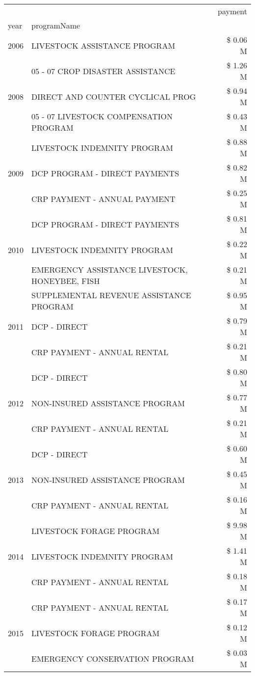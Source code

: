 \begin{tabular}{llr}
\toprule
 &  & payment \\
year & programName &  \\
\midrule
2006 & LIVESTOCK ASSISTANCE PROGRAM & \$ 0.06 M \\
\cline{1-3}
\multirow[t]{3}{*}{2008} & 05 - 07 CROP DISASTER ASSISTANCE & \$ 1.26 M \\
 & DIRECT AND COUNTER CYCLICAL PROG & \$ 0.94 M \\
 & 05 - 07 LIVESTOCK COMPENSATION PROGRAM & \$ 0.43 M \\
\cline{1-3}
\multirow[t]{3}{*}{2009} & LIVESTOCK INDEMNITY PROGRAM & \$ 0.88 M \\
 & DCP PROGRAM - DIRECT PAYMENTS & \$ 0.82 M \\
 & CRP PAYMENT - ANNUAL PAYMENT & \$ 0.25 M \\
\cline{1-3}
\multirow[t]{3}{*}{2010} & DCP PROGRAM - DIRECT PAYMENTS & \$ 0.81 M \\
 & LIVESTOCK INDEMNITY PROGRAM & \$ 0.22 M \\
 & EMERGENCY ASSISTANCE LIVESTOCK, HONEYBEE, FISH & \$ 0.21 M \\
\cline{1-3}
\multirow[t]{3}{*}{2011} & SUPPLEMENTAL REVENUE ASSISTANCE PROGRAM & \$ 0.95 M \\
 & DCP - DIRECT & \$ 0.79 M \\
 & CRP PAYMENT - ANNUAL RENTAL & \$ 0.21 M \\
\cline{1-3}
\multirow[t]{3}{*}{2012} & DCP - DIRECT & \$ 0.80 M \\
 & NON-INSURED ASSISTANCE PROGRAM & \$ 0.77 M \\
 & CRP PAYMENT - ANNUAL RENTAL & \$ 0.21 M \\
\cline{1-3}
\multirow[t]{3}{*}{2013} & DCP - DIRECT & \$ 0.60 M \\
 & NON-INSURED ASSISTANCE PROGRAM & \$ 0.45 M \\
 & CRP PAYMENT - ANNUAL RENTAL & \$ 0.16 M \\
\cline{1-3}
\multirow[t]{3}{*}{2014} & LIVESTOCK FORAGE PROGRAM & \$ 9.98 M \\
 & LIVESTOCK INDEMNITY PROGRAM & \$ 1.41 M \\
 & CRP PAYMENT - ANNUAL RENTAL & \$ 0.18 M \\
\cline{1-3}
\multirow[t]{3}{*}{2015} & CRP PAYMENT - ANNUAL RENTAL & \$ 0.17 M \\
 & LIVESTOCK FORAGE PROGRAM & \$ 0.12 M \\
 & EMERGENCY CONSERVATION PROGRAM & \$ 0.03 M \\

\end{tabular}
